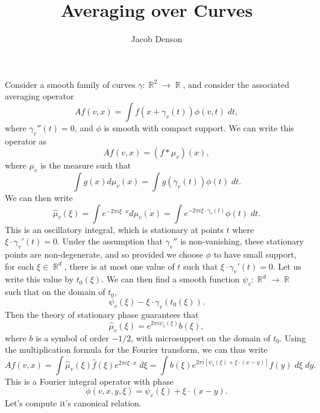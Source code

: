 \documentclass{article}
\title{Averaging over Curves}
\author{Jacob Denson}
\theoremstyle{plain}
\theoremstyle{remark}
\theoremstyle{definition}
\DeclareMathOperator{\RR}{\mathbb{R}}
\begin{document}
\maketitle

Consider a smooth family of curves $\gamma: \RR^2 \to \RR$, and consider the associated averaging operator
%
\[ Af(v,x) = \int f(x + \gamma_v(t)) \phi(v,t)\; dt, \]
%
where $\gamma_v''(t) = 0$, and $\phi$ is smooth with compact support. We can write this operator as
%
\[ Af(v,x) = (f * \mu_v)(x), \]
%
where $\mu_v$ is the measure such that
%
\[ \int g(x) d\mu_v(x) = \int g(\gamma_v(t)) \phi(t)\; dt. \]
%
We can then write
%
\[ \widehat{\mu}_v(\xi) = \int e^{-2 \pi i \xi \cdot x} d\mu_v(x) = \int e^{-2 \pi i \xi \cdot \gamma_v(t)} \phi(t)\; dt. \]
%
This is an oscillatory integral, which is stationary at points $t$ where $\xi \cdot \gamma_v'(t) = 0$. Under the assumption that $\gamma_v''$ is non-vanishing, these stationary points are non-degenerate, and so provided we choose $\phi$ to have small support, for each $\xi \in \RR^d$, there is at most one value of $t$ such that $\xi \cdot \gamma_v'(t) = 0$. Let us write this value by $t_0(\xi)$. We can then find a smooth function $\psi_v: \RR^d \to \RR$ such that on the domain of $t_0$,
%
\[ \psi_v(\xi) - \xi \cdot \gamma_v(t_0(\xi)). \]
%
Then the theory of stationary phase guarantees that
%
\[ \widehat{\mu}_v(\xi) = e^{2 \pi i \psi_v(\xi)} b(\xi), \]
%
where $b$ is a symbol of order $-1/2$, with microsupport on the domain of $t_0$. Using the multiplication formula for the Fourier transform, we can thus write
%
\[ Af(v,x) = \int \widehat{\mu}_v(\xi) \widehat{f}(\xi) e^{2 \pi i \xi \cdot x}\; d\xi = \int b(\xi) e^{2 \pi i [\psi_v(\xi) + \xi \cdot (x - y)]} f(y)\; d\xi\; dy. \]
%
This is a Fourier integral operator with phase
%
\[ \phi(v,x,y,\xi) = \psi_v(\xi) + \xi \cdot (x - y). \]
%
Let's compute it's canonical relation.
\end{document}
